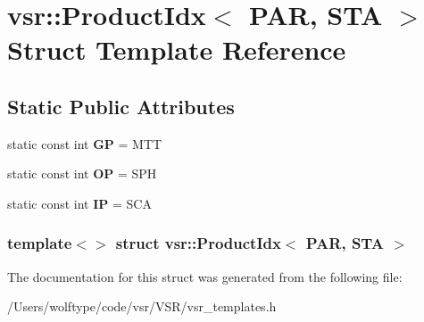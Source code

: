 \hypertarget{structvsr_1_1_product_idx_3_01_p_a_r_00_01_s_t_a_01_4}{\section{vsr\-:\-:Product\-Idx$<$ P\-A\-R, S\-T\-A $>$ Struct Template Reference}
\label{structvsr_1_1_product_idx_3_01_p_a_r_00_01_s_t_a_01_4}
}
\subsection*{Static Public Attributes}
\begin{DoxyCompactItemize}
\item 
\hypertarget{structvsr_1_1_product_idx_3_01_p_a_r_00_01_s_t_a_01_4_ac2bf0c3ffc495f6784bbc4d1c494dbb1}{static const int {\bfseries G\-P} = M\-T\-T}\label{structvsr_1_1_product_idx_3_01_p_a_r_00_01_s_t_a_01_4_ac2bf0c3ffc495f6784bbc4d1c494dbb1}

\item 
\hypertarget{structvsr_1_1_product_idx_3_01_p_a_r_00_01_s_t_a_01_4_a1c17a2b8608971b798e4c9b06d852136}{static const int {\bfseries O\-P} = S\-P\-H}\label{structvsr_1_1_product_idx_3_01_p_a_r_00_01_s_t_a_01_4_a1c17a2b8608971b798e4c9b06d852136}

\item 
\hypertarget{structvsr_1_1_product_idx_3_01_p_a_r_00_01_s_t_a_01_4_a5eae460b3a10ff28d21f2b9db847c6ed}{static const int {\bfseries I\-P} = S\-C\-A}\label{structvsr_1_1_product_idx_3_01_p_a_r_00_01_s_t_a_01_4_a5eae460b3a10ff28d21f2b9db847c6ed}

\end{DoxyCompactItemize}
\subsubsection*{template$<$$>$ struct vsr\-::\-Product\-Idx$<$ P\-A\-R, S\-T\-A $>$}



The documentation for this struct was generated from the following file\-:\begin{DoxyCompactItemize}
\item 
/\-Users/wolftype/code/vsr/\-V\-S\-R/vsr\-\_\-templates.\-h\end{DoxyCompactItemize}
